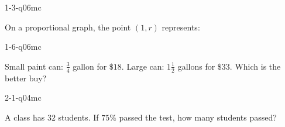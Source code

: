 \documentclass[12pt, fleqn, openany]{studyGuide}
\begin{document}
\renewcommand{\VMBookTitle}{5 Full-Length Florida FAST Grade 7 Math Practice Tests}
\renewcommand{\VMBookSubtitle}{Extra Practice for Test Day Success}
\renewcommand{\VMFooterURL}{https://viewmath.com/grade7}
\renewcommand{\VMFooterURLDisplay}{ViewMath.com/Grade7}






\tableofcontents
\cleardoublepage
{}


\begin{practiceQuestion}{1-3-q06}{mc}
\begin{questionText}
On a proportional graph, the point $(1, r)$ represents:
\end{questionText}
\end{practiceQuestion}

\begin{practiceQuestion}{1-6-q06}{mc}
\begin{questionText}
Small paint can: $\frac{3}{4}$ gallon for $\$18$. Large can: $1\frac{1}{2}$ gallons for $\$33$. Which is the better buy?
\end{questionText}
\end{practiceQuestion}

\begin{practiceQuestion}{2-1-q04}{mc}
\begin{questionText}
A class has $32$ students. If $75\%$ passed the test, how many students passed?
\end{questionText}
\end{practiceQuestion}
\end{document}
